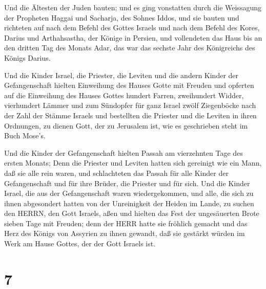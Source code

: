  Und die Ältesten der Juden bauten; und es ging vonstatten
durch die Weissagung der Propheten Haggai und Sacharja, des Sohnes
Iddos, und sie bauten und richteten auf nach dem Befehl des Gottes
Israels und nach dem Befehl des Kores, Darius und Arthahsastha, der
Könige in Persien,  und vollendeten das Haus bis an den
dritten Tag des Monats Adar, das war das sechste Jahr des Königreichs
des Königs Darius.

 Und die Kinder Israel, die Priester, die Leviten und die
andern Kinder der Gefangenschaft hielten Einweihung des Hauses Gotte mit
Freuden  und opferten auf die Einweihung des Hauses Gottes
hundert Farren, zweihundert Widder, vierhundert Lämmer und zum Sündopfer
für ganz Israel zwölf Ziegenböcke nach der Zahl der Stämme Israels
 und bestellten die Priester und die Leviten in ihren
Ordnungen, zu dienen Gott, der zu Jerusalem ist, wie es geschrieben
steht im Buch Mose's.

 Und die Kinder der Gefangenschaft hielten Passah am
vierzehnten Tage des ersten Monats;  Denn die Priester und
Leviten hatten sich gereinigt wie ein Mann, daß sie alle rein waren, und
schlachteten das Passah für alle Kinder der Gefangenschaft und für ihre
Brüder, die Priester und für sich.  Und die Kinder Israel,
die aus der Gefangenschaft waren wiedergekommen, und alle, die sich zu
ihnen abgesondert hatten von der Unreinigkeit der Heiden im Lande, zu
suchen den HERRN, den Gott Israels, aßen  und hielten das
Fest der ungesäuerten Brote sieben Tage mit Freuden; denn der HERR hatte
sie fröhlich gemacht und das Herz des Königs von Assyrien zu ihnen
gewandt, daß sie gestärkt würden im Werk am Hause Gottes, der der Gott
Israels ist.

\hypertarget{section-6}{%
\section{7}\label{section-6}}

